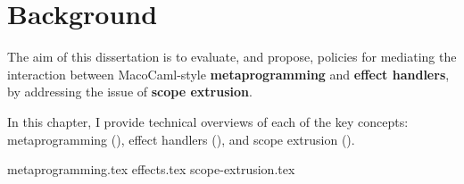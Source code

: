 
\chapter{Background}
The aim of this dissertation is to evaluate, and propose, policies for mediating the interaction between MacoCaml-style \textbf{metaprogramming} and \textbf{effect handlers}, by addressing the issue of \textbf{scope extrusion}.

In this chapter, I provide technical overviews of each of the key concepts: metaprogramming (), effect handlers (), and scope extrusion ().

{metaprogramming.tex}
{effects.tex}
{scope-extrusion.tex}
